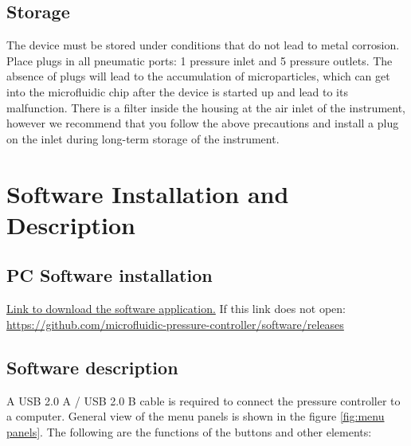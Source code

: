 \documentclass[twoside, 12pt, a4paper]{refart}
\begin{document}
  \subsection{Storage}
    The device must be stored under conditions that do not lead to metal corrosion. Place plugs in all pneumatic ports: 1 pressure inlet and 5 pressure outlets. The absence of plugs will lead to the accumulation of microparticles, which can get into the microfluidic chip after the device is started up and lead to its malfunction. There is a filter inside the housing at the air inlet of the instrument, however we recommend that you follow the above precautions and install a plug on the inlet during long-term storage of the instrument.
    
  \newpage
  \section{Software Installation and Description}
  \label{soft-inst}
  
  \subsection{PC Software installation}
    \href{https://github.com/microfluidic-pressure-controller/software/releases}{Link to download the software application.}
    \newline If this link does not open:\\
    \url {https://github.com/microfluidic-pressure-controller/software/releases}
    
  \subsection{Software description}
    A USB 2.0 A / USB 2.0 B cable is required to connect the pressure controller to a computer.
    \newline General view of the menu panels is shown in the figure \ref{fig:menu panels}.
The following are the functions of the buttons and other elements:
      
\end{document}
